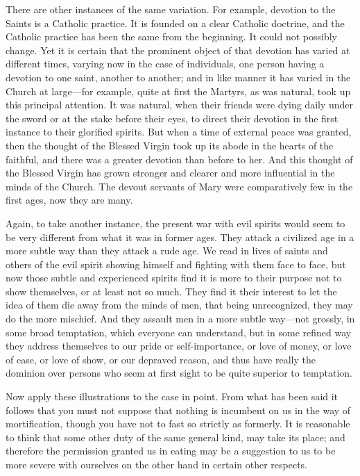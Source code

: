 There are other instances of the same variation.
For example, devotion to the Saints is a Catholic practice. It is
founded on a clear Catholic doctrine, and the Catholic practice has
been the same from the beginning. It could not possibly change. Yet it
is certain that the prominent object of that devotion has varied at
different times, varying now in the case of individuals, one person
having a devotion to one saint, another to another; and in like manner
it has varied in the Church at large—for example, quite at first the
Martyrs, as was natural, took up this principal attention. It was
natural, when their friends were dying daily under the sword or at the
stake before their eyes, to direct their devotion in the first
instance to their glorified spirits. But when a time of external peace
was granted, then the thought of the Blessed Virgin took up its abode
in the hearts of the faithful, and there was a greater devotion than
before to her. And this thought of the Blessed Virgin has grown
stronger and clearer and more influential in the minds of the Church.
The devout servants of Mary were comparatively few in the first ages,
now they are many.

Again, to take another instance, the present war
with evil spirits would seem to be very different from what it
was in former ages. They attack a civilized age in a more subtle way
than they attack a rude age. We read in lives of saints and others of
the evil spirit showing himself and fighting with them face to face,
but now those subtle and experienced spirits find it is more to their
purpose not to show themselves, or at least not so much. They find it
their interest to let the idea of them die away from the minds of men,
that being unrecognized, they may do the more mischief. And they
assault men in a more subtle way—not grossly, in some broad
temptation, which everyone can understand, but in some refined way
they address themselves to our pride or self-importance, or love of
money, or love of ease, or love of show, or our depraved reason, and
thus have really the dominion over persons who seem at first sight to
be quite superior to temptation.

Now apply these illustrations to the case in
point. From what has been said it follows that you must not suppose
that nothing is incumbent on us in the way of mortification, though
you have not to fast so strictly as formerly. It is reasonable to
think that some other duty of the same general kind, may take its
place; and therefore the permission granted us in eating may be a
suggestion to us to be more severe with ourselves on the other hand in
certain other respects.

